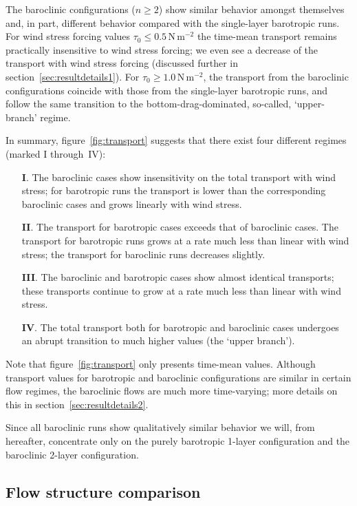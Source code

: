 \documentclass{agujournal2019}
\newcommand{\Pa}		{\mathrm{N}\,\mathrm{m}^{-2}}
\begin{document}
The baroclinic configurations ($n\ge2$) show similar behavior amongst themselves and, in part, different behavior compared with the single-layer barotropic runs. For wind stress forcing values $\tau_0\le 0.5\,\Pa$ the time-mean transport remains practically insensitive to wind stress forcing; we even see a decrease of the transport with wind stress forcing (discussed further in section~\ref{sec:resultdetails1}). For $\tau_0 \ge 1.0\,\Pa$, the transport from the baroclinic configurations coincide with those from the single-layer barotropic runs, and follow the same transition to the bottom-drag-dominated, so-called, `upper-branch' regime.

In summary, figure~\ref{fig:transport} suggests that there exist four different regimes (marked I through~IV):
\begin{enumerate}
  \item[\textbf{I}.]  The baroclinic cases show insensitivity on the total transport with wind stress; for barotropic runs the transport is lower  than the corresponding baroclinic cases and grows linearly with wind stress.
  \item[\textbf{II}.] The transport for barotropic cases exceeds that of baroclinic cases. The transport for barotropic runs grows at a rate much less than linear with wind stress; the transport for baroclinic runs decreases slightly.
  \item[\textbf{III}.] The baroclinic and barotropic cases show almost identical transports; these transports continue to grow at a rate much less than linear with wind stress.
  \item[\textbf{IV}.] The total transport both for barotropic and baroclinic cases undergoes an abrupt transition to much higher values (the `upper branch').
\end{enumerate}

Note that figure~\ref{fig:transport} only presents time-mean values. Although transport values for barotropic and baroclinic configurations are similar in certain flow regimes, the baroclinic flows are much more time-varying; more details on this in section~\ref{sec:resultdetails2}.

Since all baroclinic runs show qualitatively similar behavior we will, from hereafter, concentrate only on the purely barotropic 1-layer configuration and the baroclinic 2-layer configuration.

\subsection{Flow structure comparison}
\end{document}

